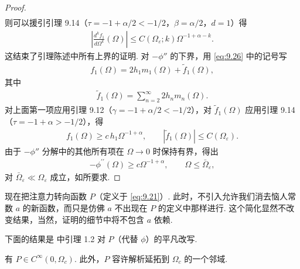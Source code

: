 \begin{proof}
\begin{align*}
\end{align*}
则可以援引引理 9.14（$\tau = -1 + \alpha/2 < -1/2$，$\beta = \alpha/2$，$d = 1$）得
\begin{align*}
  \left|\frac{d^{k}f_{1}}{d\Omega^{k}}(\Omega)\right|\leq C(\Omega_{\varepsilon};k)\Omega^{-1+\alpha-k}.
\end{align*}
这结束了引理陈述中所有上界的证明. 对 $-\phi''$ 的下界，用 \eqref{eq:9.26} 中的记号写
\begin{align*}
  f_{1}(\Omega)=2h_{1}m_{1}(\Omega)+\tilde{f}_{1}(\Omega),
\end{align*}
其中
\begin{align*}
  \tilde{f}_{1}(\Omega)=\sum_{n=2}^{\infty}2h_{n}m_{n}(\Omega).
\end{align*}
对上面第一项应用引理 9.12（$\gamma = -1 + \alpha/2 < -1/2$），对 $\tilde{f}_1(\Omega)$ 应用引理 9.14（$\tau = -1 + \alpha > -1/2$），得
\begin{align*}
  f_{1}(\Omega)\geq c\,h_{1}\Omega^{-1+\alpha},\qquad
  |\tilde{f}_{1}(\Omega)|\leq C(\Omega_{\varepsilon}).
\end{align*}
由于 $-\phi''$ 分解中的其他所有项在 $\Omega \to 0$ 时保持有界，得出
\begin{align*}
  -\phi^{\prime\prime}(\Omega)\geq c\Omega^{-1+\alpha},\qquad \Omega\leq\bar{\Omega}_{\varepsilon},
\end{align*}
对 $\bar{\Omega}_{\varepsilon} \ll \Omega_{\varepsilon}$ 成立，如所要求.
\end{proof}

现在把注意力转向函数 $P$（定义于 \eqref{eq:9.21}）. 此时，不引入允许我们消去恼人常数 $a$ 的新函数，而只是仿佛 $a$ 不出现在 $P$ 的定义中那样进行. 这个简化显然不改变结果，当然，证明的细节中将不包含 $a$ 依赖.

下面的结果是 \cite{b208} 中引理 1.2 对 $P$（代替 $\phi$）的平凡改写.

\begin{lemma}\label{lem:9.16}
有 $P \in C^\infty(0, \Omega_c)$. 此外，$P$ 容许解析延拓到 $\Omega_c$ 的一个邻域.
\end{lemma}


